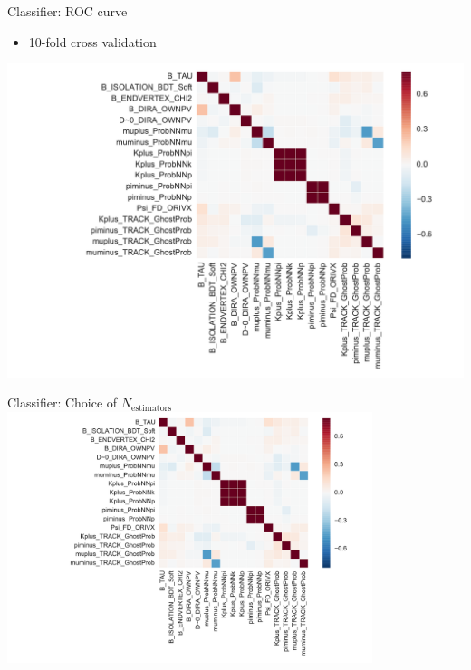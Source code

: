 \documentclass[compress,aspectratio=1610]{beamer}
\begin{document}
\begin{frame}{Classifier: ROC curve}
  \begin{minipage}{0.19\textwidth}
    \begin{itemize}
      \item 10-fold cross validation
    \end{itemize}
  \end{minipage}
  \begin{minipage}{0.8\textwidth}
    \centering
    \includegraphics[page=2,width=\textwidth]{./figures/classifier.pdf}
  \end{minipage}
\end{frame}

\begin{frame}{Classifier: Choice of $N_\text{estimators}$}
  \centering
  \includegraphics[page=3,width=0.8\textwidth]{./figures/classifier.pdf}
\end{frame}
\end{document}
